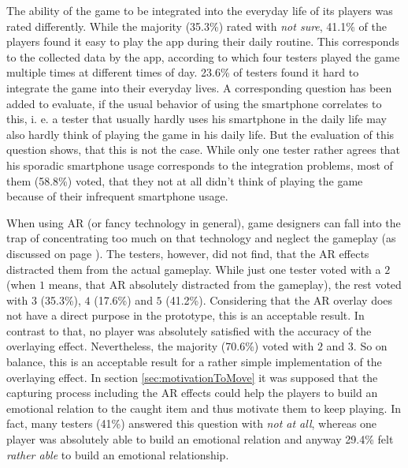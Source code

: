 The ability of the game to be integrated into the everyday life of its players was rated differently. While the majority (35.3\%) rated with \emph{not sure}, 41.1\% of the players found it easy to play the app during their daily routine. This corresponds to the collected data by the app, according to which four testers played the game multiple times at different times of day. 23.6\% of testers found it hard to integrate the game into their everyday lives. A corresponding question has been added to evaluate, if the usual behavior of using the smartphone correlates to this, i. e. a tester that usually hardly uses his smartphone in the daily life may also hardly think of playing the game in his daily life. But the evaluation of this question shows, that this is not the case. While only one tester rather agrees that his sporadic smartphone usage corresponds to the integration problems, most of them (58.8\%) voted, that they not at all didn't think of playing the game because of their infrequent smartphone usage.

When using AR (or fancy technology in general), game designers can fall into the trap of concentrating too much on that technology and neglect the gameplay (as discussed on page \pageref{sec:usageOfARStateOfTheArt}). The testers, however, did not find, that the AR effects distracted them from the actual gameplay. While just one tester voted with a $2$ (when $1$ means, that AR absolutely distracted from the gameplay), the rest voted with $3$ (35.3\%), $4$ (17.6\%) and $5$ (41.2\%). Considering that the AR overlay does not have a direct purpose in the prototype, this is an acceptable result.  In contrast to that, no player was absolutely satisfied with the accuracy of the overlaying effect. Nevertheless, the majority (70.6\%) voted with $2$ and $3$. So on balance, this is an acceptable result for a rather simple implementation of the overlaying effect. In section \ref{sec:motivationToMove} it was supposed that the capturing process including the AR effects could help the players to build an emotional relation to the caught item and thus motivate them to keep playing. In fact, many testers (41\%) answered this question with \emph{not at all}, whereas one player was absolutely able to build an emotional relation and anyway 29.4\% felt \emph{rather able} to build an emotional relationship.

